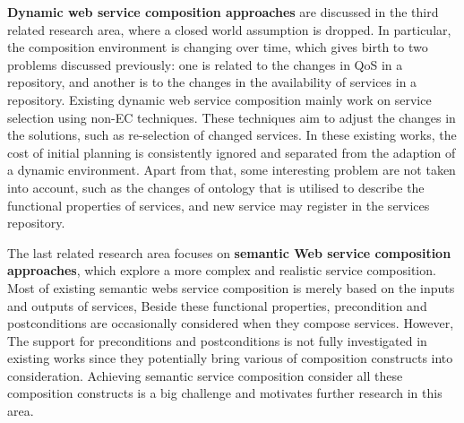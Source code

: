 \textbf{Dynamic web service composition approaches} are discussed in the third related research area, where a closed world assumption is dropped. In particular, the composition environment is changing over time, which gives birth to two problems discussed previously: one is related to the changes in QoS in a repository, and another is to the changes in the availability of services in a repository. Existing dynamic web service composition mainly work on service selection using non-EC techniques. These techniques aim to adjust the changes in the solutions, such as re-selection of changed services.  In these existing works, the cost of initial planning is consistently ignored and separated from the adaption of a dynamic environment. Apart from that, some interesting problem are not taken into account, such as the changes of ontology that is utilised to describe the functional properties of services,  and new service may register in the services repository.

The last related research area focuses on \textbf{semantic Web service composition approaches}, which explore a more complex and realistic service composition. Most of existing semantic webs service composition is merely based on the inputs and outputs of services, Beside these functional properties,  precondition and postconditions are occasionally considered when they compose services. However,   The support for preconditions and postconditions is not fully investigated in existing works since they potentially bring various of composition constructs into consideration. Achieving semantic service composition consider all these composition constructs is a big challenge and motivates further research in this area.

